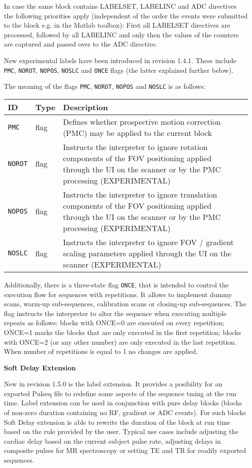 \documentclass{article}
\begin{document}
In case the same block contains LABELSET, LABELINC and ADC directives the following priorities apply (independent of the order the events were submitted to the block e.g. in the Matlab toolbox): First all LABELSET directives are processed, followed by all LABELINC and only then the values of the counters are captured and passed over to the ADC directive.  

New experimental labels have been introduced in revision 1.4.1. These include \verb.PMC., \verb.NOROT., \verb.NOPOS., \verb.NOSLC. and \verb.ONCE. flags (the latter explained further below). 

The meaning of the flags \verb.PMC., \verb.NOROT., \verb.NOPOS. and \verb.NOSLC. is as follows:

\begin{tabularx}{\textwidth}{llXl}
\toprule
ID & Type & Description\\
\midrule
\verb.PMC. & flag & Defines whether prospective motion correction (PMC) may be applied to the current block \\
\verb.NOROT. & flag & Instructs the interpreter to ignore rotation components of the FOV positioning applied through the UI on the scanner or by the PMC processing (EXPERIMENTAL) \\
\verb.NOPOS. & flag & Instructs the interpreter to ignore translation components of the FOV positioning applied through the UI on the scanner or by the PMC processing (EXPERIMENTAL) \\
\verb.NOSLC. & flag & Instructs the interpreter to ignore FOV / gradient scaling parameters applied through the UI on the scanner (EXPERIMENTAL) \\
\bottomrule
\end{tabularx}

Additionally, there is a three-state flag \verb.ONCE., that is intended to control the execution flow for sequences with repetitions. It allows to implement dummy scans, warm-up sub-sequences, calibration scans or closing-up sub-sequences. The flag instructs the interpreter to alter the sequence when executing multiple repeats as follows: blocks with ONCE=0 are executed on every repetition; ONCE=1 marks the blocks that are only executed in the first repetition; blocks with ONCE=2 (or any other number) are only executed in the last repetition. When number of repetitions is equal to 1 no changes are applied.

\textbf{Soft Delay Extension}

New in revision 1.5.0 is the label extension. It provides a posibility for an exported Pulseq file to redefine some aspects of the sequence tming at the run time. Label extension can be used in conjunction with pure delay blocks (blocks of non-zero duration containing no RF, gradient or ADC events). For such blocks Soft Delay extension is able to rewrite the duration of the block at run time based on the rule provided by the user. Typical use cases include adjusting the cardiac delay based on the current subject pulse rate, adjusting delays in composite pulses for MR spectroscopy or setting TE and TR for readily exported sequences. 
\end{document}
